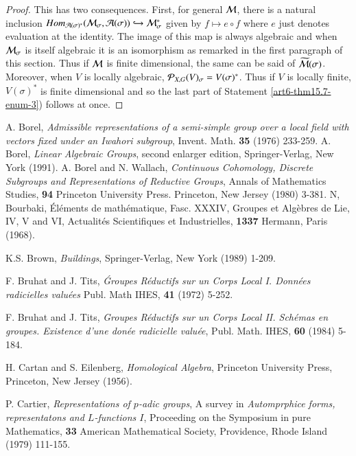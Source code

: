 \begin{proof}
This has two consequences. First, for general $\mathcal{M}$, there is a natural inclusion $Hom_{\mathcal{A}(\sigma)^{*}}(\mathcal{M}_{\sigma}, \mathcal{A}(\sigma)) \hookrightarrow \mathcal{M}_{\sigma}^{*}$ given by $f \mapsto e \circ f$ where $e$ just denotes evaluation at the identity. The image of this map is always algebraic and when $\mathcal{M}_{\sigma}$ is itself algebraic it is an isomorphism as remarked in the first  paragraph of this section. Thus if $\mathcal{M}$ is finite dimensional, the same can be said of $\widetilde{\mathcal{M}}(\sigma)$. Moreover, when $V$ is locally algebraic, $\mathcal{P}_{X, G}(V)_{\sigma} = V(\sigma)^{*}$. Thus if $V$ is locally finite, $V(\sigma)^{*}$ is finite dimensional and so the last part of Statement \ref{art6-thm15.7-enum-3}) follows at once.
\end{proof}

\begin{thebibliography}{99}
 A. Borel, \textit{Admissible representations of a semi-simple group over a local field with vectors fixed under an Iwahori subgroup}, Invent. Math. {\bf 35} (1976) 233-259.
 A. Borel, \textit{Linear Algebraic Groups}, second enlarger edition, Springer-Verlag, New York (1991).
 A. Borel and N. Wallach, \textit{Continuous Cohomology, Discrete Subgroups and Representations of Reductive Groups}, Annals of Mathematics Studies, {\bf 94} Princeton University Press. Princeton, New Jersey (1980) 3-381.
 N, Bourbaki, \'El\'ements de math\'ematique, Fasc. XXXIV, Groupes et Alg\`ebres de Lie, IV, V and VI, Actualit\'es Scientifiques et Industrielles, {\bf 1337} Hermann, Paris (1968).

 K.S. Brown, \textit{Buildings}, Springer-Verlag, New York (1989) 1-209.

 F. Bruhat and J. Tits, \textit{\'Groupes R\'eductifs sur un Corps Local I. Donn\'ees radicielles valu\'ees} Publ. Math IHES, {\bf 41} (1972) 5-252.

F. Bruhat and J. Tits, \textit{Groupes R\'eductifs sur un Corps Local II. Sch\'emas en groupes. Existence d'une don\'ee radicielle valu\'ee}, Publ. Math. IHES, {\bf 60} (1984) 5-184.

 H. Cartan and S. Eilenberg, \textit{Homological Algebra}, Princeton University Press, Princeton, New Jersey (1956).

 P. Cartier, \textit{Representations of $p$-adic groups}, A survey in \textit{Automprphice forms, representatons and $L$-functions $I$}, Proceeding on the Symposium in pure Mathematics, {\bf 33} American Mathematical Society, Providence, Rhode Island (1979) 111-155.


\end{thebibliography}
